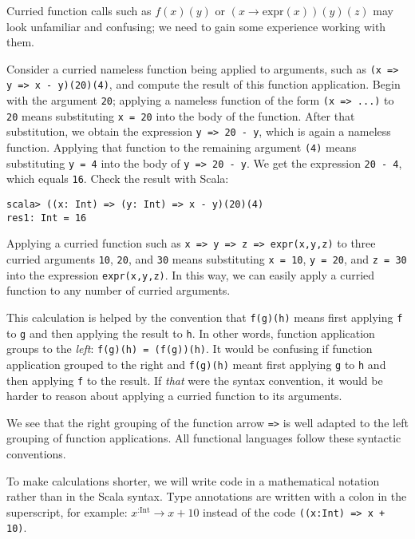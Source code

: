 \noindent Curried function calls such as $f(x)(y)$ or $\left(x\rightarrow\text{expr}(x)\right)(y)(z)$
may look unfamiliar and confusing; we need to gain some experience
working with them.

Consider a curried nameless function being applied to arguments, such
as \lstinline!(x => y => x - y)(20)(4)!, and compute the result of
this function application. Begin with the argument \lstinline!20!;
applying a nameless function of the form \lstinline!(x => ...)! to
\lstinline!20! means substituting \lstinline!x = 20! into the body
of the function. After that substitution, we obtain the expression
\lstinline!y => 20 - y!, which is again a nameless function. Applying
that function to the remaining argument \lstinline!(4)! means substituting
\lstinline!y = 4! into the body of \lstinline!y => 20 - y!. We get
the expression \lstinline!20 - 4!, which equals \lstinline!16!.
Check the result with Scala:
\begin{lstlisting}
scala> ((x: Int) => (y: Int) => x - y)(20)(4)
res1: Int = 16
\end{lstlisting}

Applying a curried function such as \lstinline!x => y => z => expr(x,y,z)!
to three curried arguments \lstinline!10!, \lstinline!20!, and \lstinline!30!
means substituting \lstinline!x = 10!, \lstinline!y = 20!, and \lstinline!z = 30!
into the expression \lstinline!expr(x,y,z)!. In this way, we can
easily apply a curried function to any number of curried arguments.

This calculation is helped by the convention that \lstinline!f(g)(h)!
means first applying \lstinline!f! to \lstinline!g! and then applying
the result to \lstinline!h!. In other words, function application
groups to the \emph{left}: \lstinline!f(g)(h) = (f(g))(h)!. It would
be confusing if function application grouped to the right and \lstinline!f(g)(h)!
meant first applying \lstinline!g! to \lstinline!h! and then applying
\lstinline!f! to the result. If \emph{that} were the syntax convention,
it would be harder to reason about applying a curried function to
its arguments.

We see that the right grouping of the function arrow \lstinline!=>!
is well adapted to the left grouping of function applications. All
functional languages follow these syntactic conventions.

To make calculations shorter, we will write code in a mathematical
notation rather than in the Scala syntax. Type annotations are written
with a colon in the superscript, for example: $x^{:\text{Int}}\rightarrow x+10$
instead of the code \lstinline!((x:Int) => x + 10)!.

